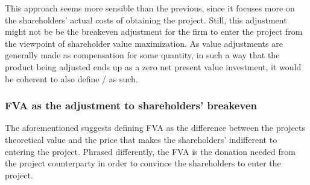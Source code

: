 \documentclass[../main.tex]{subfiles}
\begin{document}
            This approach seems more sensible than the previous, 
            since it focuses more on the shareholders' actual costs of obtaining the project.
            Still, this adjustment might not be be the breakeven adjustment
            for the firm to enter the project from the viewpoint of shareholder value maximization.
            As value adjustments are generally made as compensation for some quantity,
            in such a way that the product being adjusted ends up as a zero net present value investment,
            it would be coherent to also define \FVA/ as such.
            
        \subsubsection{FVA as the adjustment to shareholders' breakeven}
            The aforementioned suggests defining FVA as the difference between the projects theoretical value
            and the price that makes the shareholders' indifferent to entering the project.
            Phrased differently, the FVA is the donation needed from the project counterparty in order
            to convince the shareholders to enter the project.
\end{document}
